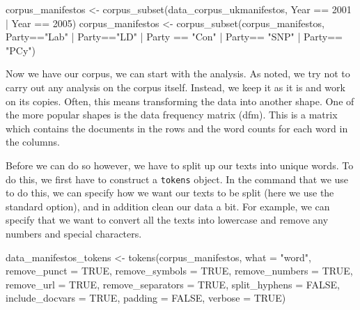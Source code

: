\documentclass[
]{book}
\newenvironment{Shaded}{\begin{snugshade}}{\end{snugshade}}
\newcommand{\AttributeTok}[1]{\textcolor[rgb]{0.77,0.63,0.00}{#1}}
\newcommand{\ConstantTok}[1]{\textcolor[rgb]{0.00,0.00,0.00}{#1}}
\newcommand{\DecValTok}[1]{\textcolor[rgb]{0.00,0.00,0.81}{#1}}
\newcommand{\FunctionTok}[1]{\textcolor[rgb]{0.00,0.00,0.00}{#1}}
\newcommand{\NormalTok}[1]{#1}
\newcommand{\OtherTok}[1]{\textcolor[rgb]{0.56,0.35,0.01}{#1}}
\newcommand{\SpecialCharTok}[1]{\textcolor[rgb]{0.00,0.00,0.00}{#1}}
\newcommand{\StringTok}[1]{\textcolor[rgb]{0.31,0.60,0.02}{#1}}
\begin{document}
\begin{Shaded}
\begin{Highlighting}[]
\NormalTok{corpus\_manifestos }\OtherTok{\textless{}{-}} \FunctionTok{corpus\_subset}\NormalTok{(data\_corpus\_ukmanifestos, Year }\SpecialCharTok{==} \DecValTok{2001} \SpecialCharTok{|}\NormalTok{ Year }\SpecialCharTok{==} \DecValTok{2005}\NormalTok{)}
\NormalTok{corpus\_manifestos }\OtherTok{\textless{}{-}} \FunctionTok{corpus\_subset}\NormalTok{(corpus\_manifestos, Party}\SpecialCharTok{==}\StringTok{"Lab"} \SpecialCharTok{|}\NormalTok{ Party}\SpecialCharTok{==}\StringTok{"LD"} \SpecialCharTok{|}\NormalTok{ Party }\SpecialCharTok{==} \StringTok{"Con"} \SpecialCharTok{|}\NormalTok{ Party}\SpecialCharTok{==} \StringTok{"SNP"} \SpecialCharTok{|}\NormalTok{ Party}\SpecialCharTok{==} \StringTok{"PCy"}\NormalTok{)}
\end{Highlighting}
\end{Shaded}

Now we have our corpus, we can start with the analysis. As noted, we try not to carry out any analysis on the corpus itself. Instead, we keep it as it is and work on its copies. Often, this means transforming the data into another shape. One of the more popular shapes is the data frequency matrix (dfm). This is a matrix which contains the documents in the rows and the word counts for each word in the columns.

Before we can do so however, we have to split up our texts into unique words. To do this, we first have to construct a \texttt{tokens} object. In the command that we use to do this, we can specify how we want our texts to be split (here we use the standard option), and in addition clean our data a bit. For example, we can specify that we want to convert all the texts into lowercase and remove any numbers and special characters.

\begin{Shaded}
\begin{Highlighting}[]
\NormalTok{data\_manifestos\_tokens }\OtherTok{\textless{}{-}} \FunctionTok{tokens}\NormalTok{(corpus\_manifestos, }\AttributeTok{what =} \StringTok{"word"}\NormalTok{, }
    \AttributeTok{remove\_punct =} \ConstantTok{TRUE}\NormalTok{, }\AttributeTok{remove\_symbols =} \ConstantTok{TRUE}\NormalTok{, }\AttributeTok{remove\_numbers =} \ConstantTok{TRUE}\NormalTok{, }
    \AttributeTok{remove\_url =} \ConstantTok{TRUE}\NormalTok{, }\AttributeTok{remove\_separators =} \ConstantTok{TRUE}\NormalTok{, }\AttributeTok{split\_hyphens =} \ConstantTok{FALSE}\NormalTok{, }
    \AttributeTok{include\_docvars =} \ConstantTok{TRUE}\NormalTok{, }\AttributeTok{padding =} \ConstantTok{FALSE}\NormalTok{, }\AttributeTok{verbose =} \ConstantTok{TRUE}\NormalTok{)}
\end{Highlighting}
\end{Shaded}
\end{document}
